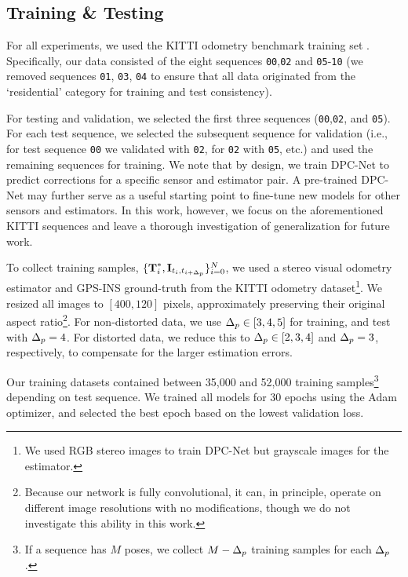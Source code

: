 \subsection{Training \& Testing}
For all experiments, we used the KITTI odometry benchmark training set \cite{Geiger2013-ky}. Specifically, our data consisted of the eight sequences \texttt{00},\texttt{02} and \texttt{05}-\texttt{10} (we removed sequences \texttt{01}, \texttt{03}, \texttt{04} to ensure that all data originated from the `residential' category for training and test consistency).

For testing and validation, we selected the first three sequences (\texttt{00},\texttt{02}, and \texttt{05}). For each test sequence, we selected the subsequent sequence for validation (i.e., for test sequence \texttt{00} we validated with \texttt{02}, for \texttt{02} with \texttt{05}, etc.) and used the remaining sequences for training.  We note that by design, we train DPC-Net to predict corrections for a specific sensor and estimator pair. A pre-trained DPC-Net may further serve as a useful starting point to fine-tune new models for other sensors and estimators. In this work, however, we focus on the aforementioned KITTI sequences and leave a thorough investigation of generalization for future work.

To collect training samples, $\{ \boldsymbol{\mathbf{T}}^*_i, \boldsymbol{\mathbf{I}}_{t_{i}, t_{i+\Delta_p}} \}^N_{i=0}$, we used a stereo visual odometry estimator and GPS-INS ground-truth from the KITTI odometry dataset\footnote{We used RGB stereo images to train DPC-Net but grayscale images for the estimator.}. We resized all images to ${[400, 120]}$ pixels, approximately preserving their original aspect ratio\footnote{Because our network is fully convolutional, it can, in principle, operate on different image resolutions with no modifications, though we do not investigate this ability in this work.}. For non-distorted data, we use $\Delta_p \in {[3,4,5]}$ for training, and test with $\Delta_p = 4$. For distorted data, we reduce this to $\Delta_p \in {[2,3,4]}$ and $\Delta_p = 3$, respectively, to compensate for the larger estimation errors.

Our training datasets contained between 35,000 and 52,000 training samples\footnote{If a sequence has $M$ poses, we collect $M - \Delta_p$ training samples for each $\Delta_p$.} depending on test sequence. We trained all models for 30 epochs using the Adam optimizer, and selected the best epoch based on the lowest validation loss.



